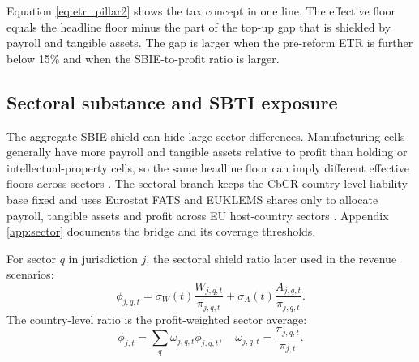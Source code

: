 \documentclass[11pt,a4paper]{article}
\begin{document}
Equation \eqref{eq:etr_pillar2} shows the tax concept in one line. The effective floor equals the headline floor minus the part of the top-up gap that is shielded by payroll and tangible assets. The gap is larger when the pre-reform ETR is further below 15\% and when the SBIE-to-profit ratio is larger.

\subsection{Sectoral substance and SBTI exposure}\label{sec:sbti_amplification}\label{sec:sbti}\label{sec:sbie_decomp}

The aggregate SBIE shield can hide large sector differences. Manufacturing cells generally have more payroll and tangible assets relative to profit than holding or intellectual-property cells, so the same headline floor can imply different effective floors across sectors \citep{devereux2023,schjelderup2024}. The sectoral branch keeps the CbCR country-level liability base fixed and uses Eurostat FATS and EUKLEMS shares only to allocate payroll, tangible assets and profit across EU host-country sectors \citep{eurostat2025fats,euklemsintanprod2025}. Appendix \ref{app:sector} documents the bridge and its coverage thresholds.

For sector $q$ in jurisdiction $j$, the sectoral shield ratio later used in the revenue scenarios:
\begin{equation}\label{eq:rho_sector}
\phi_{j,q,t}=\sigma_W(t)\frac{W_{j,q,t}}{\pi_{j,q,t}}+\sigma_A(t)\frac{A_{j,q,t}}{\pi_{j,q,t}}.
\end{equation}
The country-level ratio is the profit-weighted sector average:
\begin{equation}\label{eq:rho_sectoral}
\phi_{j,t}=\sum_q\omega_{j,q,t}\phi_{j,q,t},\quad \omega_{j,q,t}=\frac{\pi_{j,q,t}}{\pi_{j,t}}.
\end{equation}
\end{document}
